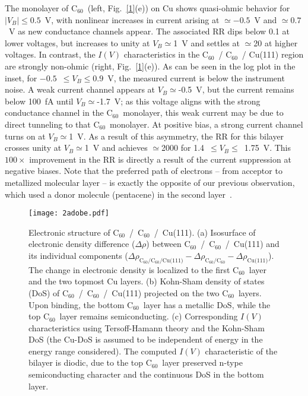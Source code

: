 \documentclass[11pt,showpacs,amsmath,amssymbl]{revtex4}
\newcommand{\buck}{C$_{60}$~}
\begin{document}
The monolayer of \buck (left, Fig.~\ref{1}(e)) on Cu shows quasi-ohmic behavior for $\left| V_B \right| \leq 0.5$~V, with nonlinear increases in current arising at $\simeq-0.5$~V and $\simeq0.7$~V as new conductance channels appear.  The associated RR dips below 0.1 at lower voltages, but increases to unity at $V_B \simeq$1~V and settles at $\simeq$20 at higher voltages.  In contrast, the $I(V)$ characteristics in the \buck / \buck / Cu(111) region are strongly non-ohmic (right, Fig.~\ref{1}(e)).  As can be seen in the log plot in the inset, for $-0.5$~$\leq V_B \leq 0.9$~V, the measured current is below the instrument noise.  A weak current channel appears at $V_B \simeq$-0.5~V, but the current remains below 100~fA until $V_B \simeq$-1.7~V; as this voltage aligns with the strong conductance channel in the \buck monolayer, this weak current may be due to direct tunneling to that \buck monolayer.  At positive bias, a strong current channel turns on at $V_B \simeq$1~V.  As a result of this asymmetry, the RR for this bilayer crosses unity at $V_B \simeq$1~V and achieves $\simeq$2000 for 1.4~$\leq V_B \leq$~1.75~V.  This $100\times$ improvement in the RR is directly a result of the current suppression at negative biases.  Note that the preferred path of electrons -- from acceptor to metallized molecular layer -- is exactly the opposite of our previous observation, which used a donor molecule (pentacene) in the second layer~\cite{smerdon2016large}.


\begin{figure}
\texttt{[image: 2adobe.pdf]}
\caption{Electronic structure of \buck /~\buck /~Cu(111). (a) Isosurface of electronic density difference ($\Delta\rho$) between \buck/~\buck/~Cu(111) and its individual components ($\Delta\rho_{\textrm{C}_{60}/\textrm{C}_{60}/\textrm{Cu(111)}} - \Delta\rho_{\textrm{C}_{60}/\textrm{C}_{60}} - \Delta\rho_{\textrm{Cu(111)}} $). The change in electronic density is localized to the first \buck layer and the two topmost Cu layers. (b) Kohn-Sham density of states (DoS) of \buck/~\buck/~Cu(111) projected on the two \buck layers. Upon binding, the bottom \buck layer has a metallic DoS, while the top \buck layer remains semiconducting.  (c) Corresponding $I(V)$ characteristics using Tersoff-Hamann theory and the Kohn-Sham DoS (the Cu-DoS is assumed to be independent of energy in the energy range considered). The computed $I(V)$ characteristic of the bilayer is diodic, due to the top \buck layer preserved n-type semiconducting character and the continuous DoS in the bottom layer.}
\label{2}
\end{figure}
\end{document}
